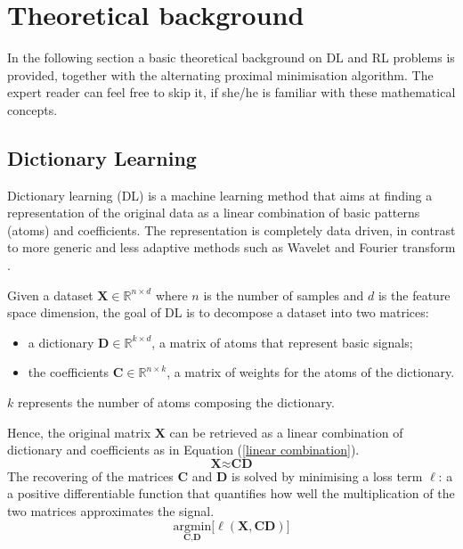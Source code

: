 \documentclass[a4paper,UKenglish]{oasics}
\begin{document}
\section{Theoretical background} \label{background}

In the following section a basic theoretical background on DL and RL problems is provided, together with the alternating proximal minimisation algorithm. The expert reader can feel free to skip it, if she/he is familiar with these mathematical concepts.


\subsection{Dictionary Learning}
Dictionary learning (DL) is a machine learning method that aims at finding a representation of the original data as a linear combination of basic patterns (atoms) and coefficients. The representation is completely data driven, in contrast to more generic and less adaptive methods such as Wavelet and Fourier transform \cite{mallat2008wavelet, vetterli2013fourier}.

Given a dataset $\textbf{X} \in \mathbb{R}^{n\times d}$ where $n$ is the number of samples and $d$ is the feature space dimension, the goal of DL is to decompose a dataset into two matrices:
\begin{itemize}
\item a dictionary $\textbf{D} \in \mathbb{R}^{k\times d}$, a matrix of atoms that represent basic signals;
\item the coefficients $\textbf{C} \in \mathbb{R}^{n\times k}$, a matrix of weights for the atoms of the dictionary.
\end{itemize}
$k$ represents the number of atoms composing the dictionary.%

Hence, the original matrix $\textbf{X}$ can be retrieved as a linear combination of dictionary and coefficients as in Equation (\ref{linear combination}).
\begin{equation}\label{linear combination}
\textbf{X} \approx \textbf{C}\textbf{D}
\end{equation}
The recovering of the matrices $\textbf{C}$ and $\textbf{D}$ is solved by minimising a loss term $\ell$: a a positive differentiable function that quantifies how well the multiplication of the two matrices approximates the signal.
\begin{equation}\label{loss function}
\underset{\textbf{C}, \textbf{D}}{\text{argmin}}\bigg[\ell(\textbf{X}, \textbf{C} \textbf{D}) \bigg]
\end{equation}
\end{document}
